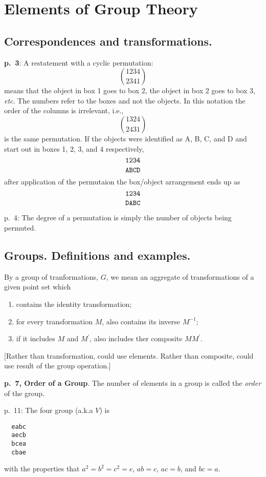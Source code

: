 \documentclass{book}
\begin{document}
\chapter{Elements of Group Theory}

\section{Correspondences and transformations.}

{\bf p.\ 3}: A restatement with a cyclic permutation:
$$
\genfrac(){0pt}0{1234}{2341}
$$
means that the object in box 1 goes to box 2, the object in box 2 goes
to box 3, {\it etc}. The numbers refer to the boxes and not the
objects. In this notation the order of the columns is irrelevant,
i.e.,
$$
\genfrac(){0pt}0{1324}{2431}
$$
is the same permutation.  If the objects were identified as A, B, C,
and D and start out in boxes 1, 2, 3, and 4 respectively,
$$
\genfrac{}{}{0pt}0{\tt 1234}{\tt ABCD}
$$
after application of the permutaion the box/object arrangement ends up as
$$
\genfrac{}{}{0pt}0{\tt 1234}{\tt DABC}
$$

p.\ 4: The degree of a permutation is simply the number of objects being permuted.

\section{Groups. Definitions and examples.}

By a group of tranformations, $G$, we mean an aggregate of
transformations of a given point set which
\begin{enumerate}
\item contains the identity transformation;
\item for every transformation $M$, also contains its inverse $M^{-1}$;
\item if it includes $M$ and $M^\prime$, also includes ther composite $MM^\prime$.
\end{enumerate}

[Rather than transformation, could use elements. Rather than
  composite, could use result of the group operation.]

{\bf p.\  7, Order of a Group}. The number of elements in a group is called the {\it order} of the group.

p.\ 11: The four group (a.k.a $V$) is

\begin{verbatim}
  eabc
  aecb
  bcea
  cbae
\end{verbatim}
with the properties that $a^2 = b^2 = c^2 = e$, $ab = c$,  $ac = b$,  and $bc = a$.
\end{document}
